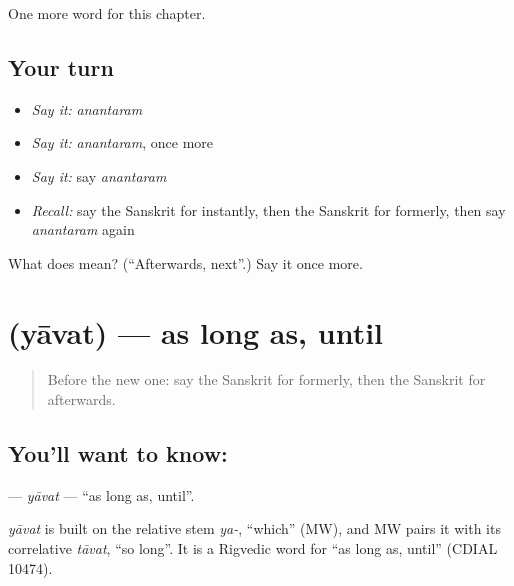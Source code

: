\begin{grammarlens}[title={What you've built}]
One more word for this chapter.
\end{grammarlens}

\subsection*{Your turn}
\begin{itemize}
\raggedright
  \item \emph{Say it:} \emph{anantaram}
  \item \emph{Say it:} \emph{anantaram}, once more
  \item \emph{Say it:} say \emph{anantaram}
  \item \emph{Recall:} say the Sanskrit for instantly, then the Sanskrit for formerly, then say \emph{anantaram} again
\end{itemize}

\begin{tcolorbox}[breakable,colback=teal!4,colframe=teal!35!black,title={Before you move on}]
What does  mean? (\textquotedblleft{}Afterwards, next\textquotedblright{}.) Say it once more.
\end{tcolorbox}
\section[\texorpdfstring{\sk{यावत्} (yāvat)}{यावत् (yāvat)}]{ (yāvat) — as long as, until}

\label{lesson:SA-C213-yavat}



\begin{quote}
Before the new one: say the Sanskrit for formerly, then the Sanskrit for afterwards.
\end{quote}

\subsection*{You'll want to know: }
\textbf{} — \emph{yāvat} — \textquotedblleft{}as long as, until\textquotedblright{}.

\begin{cousinweb}
\emph{yāvat} is built on the relative stem \emph{ya-}, \textquotedblleft{}which\textquotedblright{} (MW), and MW pairs it with its correlative \emph{tāvat}, \textquotedblleft{}so long\textquotedblright{}. It is a Rigvedic word for \textquotedblleft{}as long as, until\textquotedblright{} (CDIAL 10474).
\end{cousinweb}

